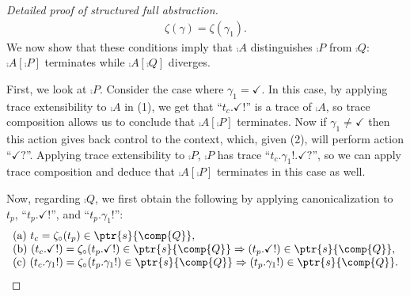 \documentclass[10pt, conference, compsocconf, letterpaper, times]{IEEEtran}
\begin{document}
\begin{proof}[Detailed proof of structured full abstraction]
\[\begin{array}{l}
        \zeta(\gamma) = \zeta(\gamma_1).
\end{array}
\]
We now show that these conditions imply that
\iffull
$\comp{A}$ distinguishes $\comp{P}$ from $\comp{Q}$:
\fi
$\comp{A}\![\comp{P}]$
terminates while $\comp{A}[\comp{Q}]$ diverges.
\ifsooner
{}
\fi

First, we look at $\comp{P}$.
Consider the case where
$\gamma_1 = \checkmark$.
In this case, by applying trace extensibility to $\comp{A}$ in (1), we
get that
``$t_c.\checkmark!$'' is a trace of $\comp{A}$, so trace
composition allows us to conclude that $\comp{A}[\comp{P}]$
terminates.
Now if $\gamma_1 \neq \checkmark$ then this action gives back control
to the context, which, given (2), will perform action ``$\checkmark?$''.
Applying trace extensibility to $\comp{P}$, $\comp{P}$ has trace
``$t_c.\gamma_1!.\checkmark?$'', so we can apply trace composition and
deduce that $\comp{A}[\comp{P}]$ terminates in this case as well.

Now, regarding $\comp{Q}$, we first obtain the following by applying
canonicalization to $t_p$, ``$t_p.\checkmark!$'', and
``$t_p.\gamma_1!$'':
\[
\begin{array}{l}
  \text{(a) }t_c = \zeta_{\circ}(t_p) \in \ptr{s}{\comp{Q}}, \\
  \text{(b) }(t_c.\checkmark!) = \zeta_{\circ}(t_p.\checkmark!) \in \ptr{s}{\comp{Q}} \Rightarrow
  (t_p.\checkmark!) \in \ptr{s}{\comp{Q}}, \\
  \text{(c) }(t_c.\gamma_1!) = \zeta_{\circ}(t_p.\gamma_1!) \in \ptr{s}{\comp{Q}} \Rightarrow
  (t_p.\gamma_1!) \in \ptr{s}{\comp{Q}}.
\end{array}
\]


\end{proof}
\end{document}
